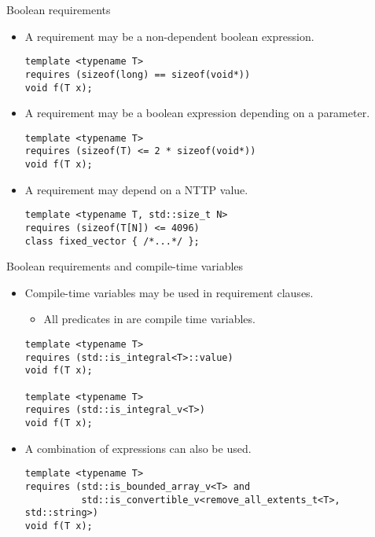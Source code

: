 \begin{frame}[t,fragile]{Boolean requirements}
\begin{itemize}
  \item A requirement may be a non-dependent boolean expression.
\begin{lstlisting}
template <typename T>
requires (sizeof(long) == sizeof(void*))
void f(T x);
\end{lstlisting}

  \item A requirement may be a boolean expression depending on a parameter.
\begin{lstlisting}
template <typename T>
requires (sizeof(T) <= 2 * sizeof(void*))
void f(T x);
\end{lstlisting}

  \item A requirement may depend on a NTTP value.
\begin{lstlisting}
template <typename T, std::size_t N>
requires (sizeof(T[N]) <= 4096)
class fixed_vector { /*...*/ };
\end{lstlisting}

\end{itemize}
\end{frame}

\begin{frame}[t,fragile]{Boolean requirements and compile-time variables}
\begin{itemize}
  \item Compile-time variables may be used in requirement clauses.
    \begin{itemize}
      \item All predicates in  are compile time variables.
    \end{itemize}
\begin{lstlisting}
template <typename T>
requires (std::is_integral<T>::value)
void f(T x);

template <typename T>
requires (std::is_integral_v<T>)
void f(T x);
\end{lstlisting}

  \item A combination of expressions can also be used.
\begin{lstlisting}
template <typename T>
requires (std::is_bounded_array_v<T> and 
          std::is_convertible_v<remove_all_extents_t<T>, std::string>)
void f(T x);
\end{lstlisting}

\end{itemize}
\end{frame}

